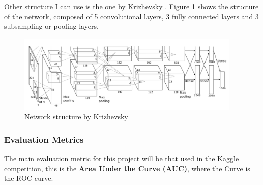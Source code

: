 \documentclass[]{article}
\begin{document}
Other structure I can use is the one by Krizhevsky \cite{Krizhevsky12}. Figure \ref{img:imagenet12} shows the structure of the network, composed of 5 convolutional layers, 3 fully connected layers and 3 subsampling or pooling layers.

\begin{figure}[htpb!]
\centering
\includegraphics[width= 0.95\textwidth]{images/imagenet12}
\caption{Network structure by Krizhevsky \cite{Krizhevsky12} \label{img:imagenet12}}
\end{figure}



\subsubsection{Evaluation Metrics}\label{evaluation-metrics}

The main evaluation metric for this project will be that used in the Kaggle competition, this is the \textbf{Area Under the Curve (AUC)}, where the Curve is the ROC curve.
\end{document}
